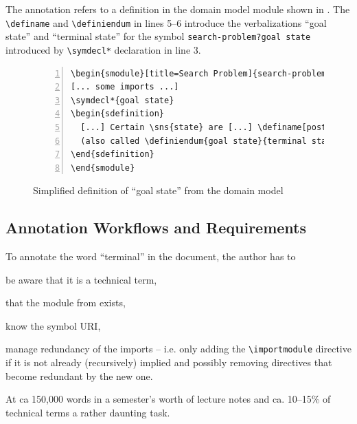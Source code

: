 \documentclass[runningheads]{llncs}
\begin{document}
The annotation refers to a definition in the domain model module shown in
.  The \lstinline|\definame| and \lstinline|\definiendum| in lines
5--6 introduce the verbalizations ``goal state'' and ``terminal state'' for the symbol
\lstinline|search-problem?goal state| introduced by \lstinline|\symdecl*| declaration in
line 3.

\begin{figure}[ht]\centering
\begin{lstlisting}[morekeywords={definame,symdecl,definiendum},numbers=left,
escapechar=!]
\begin{smodule}[title=Search Problem]{search-problem}
[... some imports ...]
\symdecl*{goal state}
\begin{sdefinition}
  [...] Certain \sns{state} are [...] \definame[post=s]{goal state} [...]
  (also called \definiendum{goal state}{terminal states}).
\end{sdefinition}
\end{smodule}
\end{lstlisting}
  \caption{Simplified definition of ``goal state'' from the domain model}\label{fig:state-space}
\end{figure}

\subsection{Annotation Workflows and Requirements}\label{sec:workflows}

To annotate the word ``terminal'' in the document, the author has to 
\begin{inparaenum}[\em i\rm)]
\item be aware that it is a
technical term, 
\item that the module from  exists,
\item know the symbol URI, 
\item manage redundancy of the imports -- i.e. only adding the \lstinline|\importmodule|
  directive if it is not already (recursively) implied and possibly removing directives
  that become redundant by the new one.
\end{inparaenum}
At ca 150,000 words in a semester's worth of lecture notes and ca. 10--15\% of technical
terms a rather daunting task.
\end{document}
